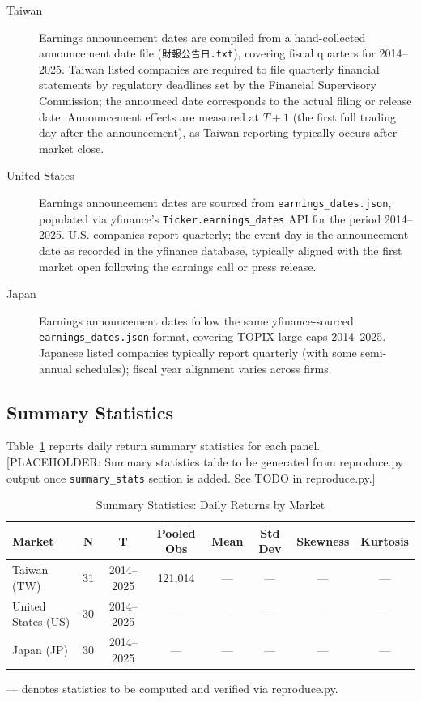 \documentclass[12pt,a4paper]{article}
\begin{document}
\begin{description}
\item[Taiwan] Earnings announcement dates are compiled from a hand-collected
  announcement date file (\texttt{財報公告日.txt}), covering fiscal quarters
  for 2014--2025. Taiwan listed companies are required to file quarterly
  financial statements by regulatory deadlines set by the Financial Supervisory
  Commission; the announced date corresponds to the actual filing or release
  date. Announcement effects are measured at $T+1$ (the first
  full trading day after the announcement), as Taiwan reporting typically occurs
  after market close.

\item[United States] Earnings announcement dates are sourced from
  \texttt{earnings\_dates.json}, populated via yfinance's
  \texttt{Ticker.earnings\_dates} API for the period 2014--2025. U.S. companies
  report quarterly; the event day is the announcement date as recorded in the
  yfinance database, typically aligned with the first market open following the
  earnings call or press release.

\item[Japan] Earnings announcement dates follow the same yfinance-sourced
  \texttt{earnings\_dates.json} format, covering TOPIX large-caps 2014--2025.
  Japanese listed companies typically report quarterly (with some semi-annual
  schedules); fiscal year alignment varies across firms.
\end{description}

\subsection{Summary Statistics}

Table~\ref{tab:summary} reports daily return summary statistics for each panel.
[PLACEHOLDER: Summary statistics table to be generated from reproduce.py output
once \texttt{summary\_stats} section is added. See TODO in reproduce.py.]

\begin{table}[htbp]
\caption{Summary Statistics: Daily Returns by Market}
\label{tab:summary}
\centering
\begin{threeparttable}
\begin{tabular}{lccccccc}
\toprule
Market & N & T & Pooled Obs & Mean & Std Dev & Skewness & Kurtosis \\
\midrule
Taiwan (TW) & 31 & 2014--2025 & 121,014 & --- & --- & --- & --- \\
United States (US) & 30 & 2014--2025 & --- & --- & --- & --- & --- \\
Japan (JP) & 30 & 2014--2025 & --- & --- & --- & --- & --- \\
\bottomrule
\end{tabular}
\begin{tablenotes}
\small
\item[*] --- denotes statistics to be computed and verified via reproduce.py.
\end{tablenotes}
\end{threeparttable}
\end{table}
\end{document}
